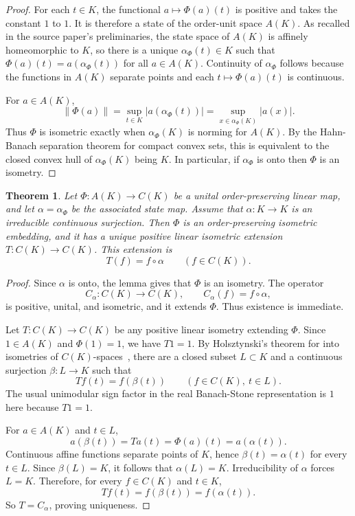\documentclass[11pt]{amsart}
\newtheorem{theorem}{Theorem}
\theoremstyle{definition}
\begin{document}
\begin{proof}
For each \(t\in K\), the functional \(a\mapsto \Phi(a)(t)\) is positive and
takes the constant \(1\) to \(1\).  It is therefore a state of the order-unit
space \(A(K)\).  As recalled in the source paper's preliminaries, the state
space of \(A(K)\) is affinely homeomorphic to \(K\), so there is a unique
\(\alpha_\Phi(t)\in K\) such that
\(\Phi(a)(t)=a(\alpha_\Phi(t))\) for all \(a\in A(K)\).
Continuity of \(\alpha_\Phi\) follows because the functions in \(A(K)\)
separate points and each \(t\mapsto \Phi(a)(t)\) is continuous.

For \(a\in A(K)\),
\[
  \|\Phi(a)\|=\sup_{t\in K}|a(\alpha_\Phi(t))|
  =\sup_{x\in \alpha_\Phi(K)}|a(x)|.
\]
Thus \(\Phi\) is isometric exactly when \(\alpha_\Phi(K)\) is norming for
\(A(K)\).  By the Hahn-Banach separation theorem for compact convex sets, this
is equivalent to the closed convex hull of \(\alpha_\Phi(K)\) being \(K\).
In particular, if \(\alpha_\Phi\) is onto then \(\Phi\) is an isometry.
\end{proof}

\begin{theorem}
Let \(\Phi:A(K)\to C(K)\) be a unital order-preserving linear map, and let
\(\alpha=\alpha_\Phi\) be the associated state map.  Assume that
\(\alpha:K\to K\) is an irreducible continuous surjection.  Then \(\Phi\) is
an order-preserving isometric embedding, and it has a unique positive linear
isometric extension \(T:C(K)\to C(K)\).  This extension is
\[
  T(f)=f\circ \alpha\qquad(f\in C(K)).
\]
\end{theorem}

\begin{proof}
Since \(\alpha\) is onto, the lemma gives that \(\Phi\) is an isometry.  The
operator
\[
  C_\alpha:C(K)\to C(K),\qquad C_\alpha(f)=f\circ\alpha,
\]
is positive, unital, and isometric, and it extends \(\Phi\).  Thus existence
is immediate.

Let \(T:C(K)\to C(K)\) be any positive linear isometry extending \(\Phi\).
Since \(1\in A(K)\) and \(\Phi(1)=1\), we have \(T1=1\).  By Holsztynski's
theorem for into isometries of \(C(K)\)-spaces~\cite{Holsztynski}, there are a
closed subset \(L\subset K\) and a continuous surjection \(\beta:L\to K\) such
that
\[
  Tf(t)=f(\beta(t))\qquad(f\in C(K),\ t\in L).
\]
The usual unimodular sign factor in the real Banach-Stone representation is
\(1\) here because \(T1=1\).

For \(a\in A(K)\) and \(t\in L\),
\[
  a(\beta(t))=Ta(t)=\Phi(a)(t)=a(\alpha(t)).
\]
Continuous affine functions separate points of \(K\), hence
\(\beta(t)=\alpha(t)\) for every \(t\in L\).  Since \(\beta(L)=K\), it follows
that \(\alpha(L)=K\).  Irreducibility of \(\alpha\) forces \(L=K\).  Therefore,
for every \(f\in C(K)\) and \(t\in K\),
\[
  Tf(t)=f(\beta(t))=f(\alpha(t)).
\]
So \(T=C_\alpha\), proving uniqueness.
\end{proof}
\end{document}
